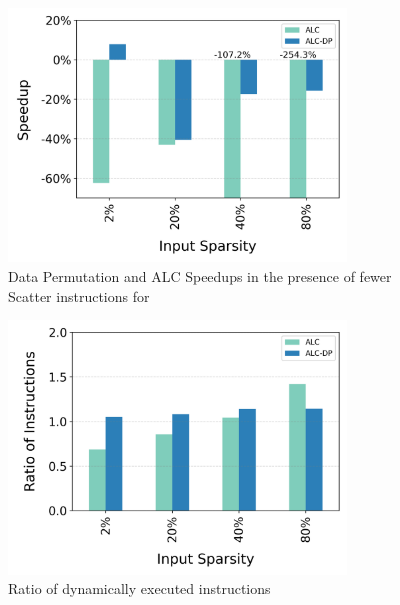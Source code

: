 \begin{figure}[t]
  \includegraphics[width=0.8\textwidth]{Figures/Evaluations/single_if_few_scatter_speedup.png}
  \caption{Data Permutation and ALC Speedups in the presence of fewer Scatter instructions for \ifThenBench}
  \label{fig:single-if-few-scatter-speedup}
\end{figure}

\begin{figure}[h!]
  \includegraphics[width=0.8\textwidth]{Figures/Evaluations/single_if_few_scatter_instr.png}
  \caption{Ratio of dynamically executed instructions}
  \label{fig:single-if-few-scatter-inst}
\end{figure}


